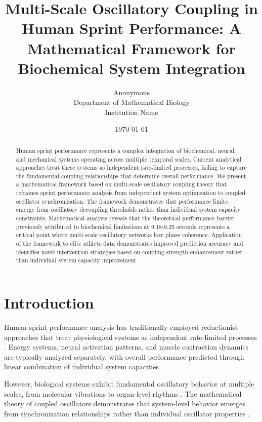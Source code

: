 \documentclass[twocolumn]{article}
\title{Multi-Scale Oscillatory Coupling in Human Sprint Performance: A Mathematical Framework for Biochemical System Integration}
\author{
Anonymous\\
Department of Mathematical Biology\\
Institution Name
}
\date{\today}
\begin{document}
\maketitle

\begin{abstract}
Human sprint performance represents a complex integration of biochemical, neural, and mechanical systems operating across multiple temporal scales. Current analytical approaches treat these systems as independent rate-limited processes, failing to capture the fundamental coupling relationships that determine overall performance. We present a mathematical framework based on multi-scale oscillatory coupling theory that reframes sprint performance analysis from independent system optimization to coupled oscillator synchronization. The framework demonstrates that performance limits emerge from oscillatory decoupling thresholds rather than individual system capacity constraints. Mathematical analysis reveals that the theoretical performance barrier previously attributed to biochemical limitations at 9.18-9.25 seconds represents a critical point where multi-scale oscillatory networks lose phase coherence. Application of the framework to elite athlete data demonstrates improved prediction accuracy and identifies novel intervention strategies based on coupling strength enhancement rather than individual system capacity improvement.
\end{abstract}

\section{Introduction}

Human sprint performance analysis has traditionally employed reductionist approaches that treat physiological systems as independent rate-limited processes \citep{brooks2005exercise,mcardle2015exercise}. Energy systems, neural activation patterns, and muscle contraction dynamics are typically analyzed separately, with overall performance predicted through linear combination of individual system capacities \citep{astrand2003textbook}.

However, biological systems exhibit fundamental oscillatory behavior at multiple scales, from molecular vibrations to organ-level rhythms \citep{glass2001synchronization,strogatz2003sync}. The mathematical theory of coupled oscillators demonstrates that system-level behavior emerges from synchronization relationships rather than individual oscillator properties \citep{kuramoto1984chemical,pikovsky2001synchronization}.
\end{document}
